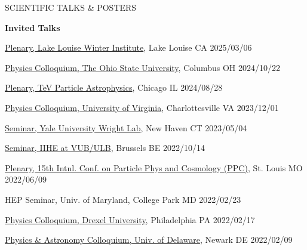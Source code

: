 \documentclass{resume} %
\begin{document}
\begin{rSection}{SCIENTIFIC TALKS \& POSTERS}

{\bf Invited Talks}
\begin{etaremune}

\item \href{https://indico.global/event/483/contributions/120341/}{Plenary, Lake Louise Winter Institute}, Lake Louise CA  \hfill 2025/03/06

\item \href{https://physics.osu.edu/events/colloquium-brian-clark-university-maryland-chasing-ghost-particle-neutrino-astrophysics}{Physics Colloquium, The Ohio State University}, Columbus OH  \hfill 2024/10/22

\item \href{https://indico.uchicago.edu/event/427/contributions/1531/}{Plenary, TeV Particle Astrophysics}, Chicago IL  \hfill 2024/08/28

\item \href{https://www.phys.virginia.edu/Announcements/talk-list.asp?PERIOD=SID:4440}{Physics Colloquium, University of Virginia}, Charlottesville VA  \hfill 2023/12/01

\item \href{https://physics.yale.edu/event/npa-seminar-brian-clark-umd-college-park-chasing-ghost-particle-neutrino-astrophysics-south}{Seminar, Yale University Wright Lab}, New Haven CT  \hfill 2023/05/04

\item \href{https://indico.iihe.ac.be/event/1620/}{Seminar, IIHE at VUB/ULB}, Brussels BE  \hfill 2022/10/14

\item \href{https://indico.cern.ch/event/1126527/contributions/4818939/}{Plenary, 15th Intnl. Conf. on Particle Phys and Cosmology (PPC)}, St. Louis MO  \hfill 2022/06/09

\item HEP Seminar, Univ. of Maryland, College Park MD \hfill 2022/02/23

\item \href{https://drexel.edu/coas/news-events/events-calendar/details/?eid=35304&iid=93965}{Physics Colloquium, Drexel University}, Philadelphia PA  \hfill 2022/02/17

\item \href{https://web.physics.udel.edu/events/colloquium/colloquium-brian-clark}{Physics \& Astronomy Colloquium, Univ. of Delaware}, Newark DE \hfill 2022/02/09


\end{etaremune}
\end{rSection}
\end{document}
